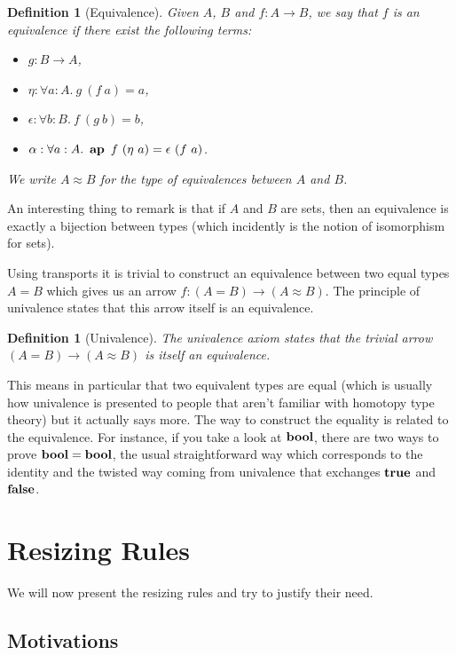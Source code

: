 \documentclass[11pt]{article}
\theoremstyle{plain}
\newtheorem{definition}[theorem]{Definition}
\theoremstyle{remark}
\begin{document}
\begin{definition}[Equivalence]
  Given $A$, $B$ and $f : A \to B$, we say that $f$ is an equivalence
  if there exist the following terms:
  \begin{itemize}
    \item $g : B \to A$,
    \item $\eta : \forall a:A.\ g\ (f\ a) = a$,
    \item $\epsilon : \forall b:B.\ f\ (g\ b) = b$,
    \item $\alpha : \forall a:A.\ \ap\ f\ (\eta\ a) = \epsilon\ (f\ a)$.
  \end{itemize}
  We write $A \approx B$ for the type of equivalences between $A$ and $B$.
\end{definition}

\noindent
An interesting thing to remark is that if $A$ and $B$ are sets, then an
equivalence is exactly a bijection between types (which incidently is the notion
of isomorphism for sets).

Using transports it is trivial to construct an equivalence between two equal
types $A = B$ which gives us an arrow $f : (A = B) \to (A \approx B)$.
The principle of univalence states that this arrow itself is an equivalence.

\begin{definition}[Univalence]
  The univalence axiom states that
  the trivial arrow $(A = B) \to (A \approx B)$ is itself an equivalence.
\end{definition}

\noindent
This means in particular that two equivalent types are equal (which is usually
how univalence is presented to people that aren't familiar with homotopy type
theory) but it actually says more. The way to construct the equality is related
to the equivalence.
For instance, if you take a look at $\operatorname{\mathbf{bool}}$, there are two ways to prove
$\operatorname{\mathbf{bool}} = \operatorname{\mathbf{bool}}$, the usual straightforward way which corresponds to the identity
and the twisted way coming from univalence that exchanges $\operatorname{\mathbf{true}}$ and $\operatorname{\mathbf{false}}$.

\section{Resizing Rules}

We will now present the resizing rules and try to justify their need.

\subsection{Motivations}
\end{document}
